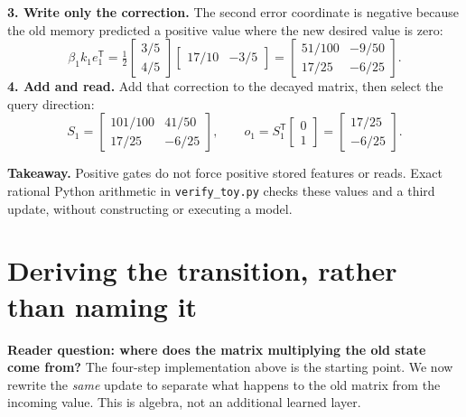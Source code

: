 \documentclass[10pt,letterpaper]{article}
\newcommand{\takeaway}[1]{\par\smallskip\noindent\textbf{Takeaway.} #1}
\newcommand{\psection}[1]{\clearpage\section{#1}}
\begin{document}
\textbf{3. Write only the correction.} The second error coordinate is negative because the old memory predicted a positive value where the new desired value is zero:
\begin{equation}
\beta_1 k_1e_1^{\mathsf T}=\tfrac12\begin{bmatrix}3/5\\4/5\end{bmatrix}
\begin{bmatrix}17/10&-3/5\end{bmatrix}
=\begin{bmatrix}51/100&-9/50\\17/25&-6/25\end{bmatrix}.
\end{equation}
\textbf{4. Add and read.} Add that correction to the decayed matrix, then select the query direction:
\begin{equation}
S_1=\begin{bmatrix}101/100&41/50\\17/25&-6/25\end{bmatrix},\qquad
o_1=S_1^{\mathsf T}\begin{bmatrix}0\\1\end{bmatrix}
=\begin{bmatrix}17/25\\-6/25\end{bmatrix}.
\end{equation}
\takeaway{Positive gates do not force positive stored features or reads. Exact rational Python arithmetic in \texttt{verify\_toy.py} checks these values and a third update, without constructing or executing a model.}

\psection{Deriving the transition, rather than naming it}
\textbf{Reader question: where does the matrix multiplying the old state come from?}
The four-step implementation above is the starting point. We now rewrite the \emph{same} update to separate what happens to the old matrix from the incoming value. This is algebra, not an additional learned layer.
\end{document}
